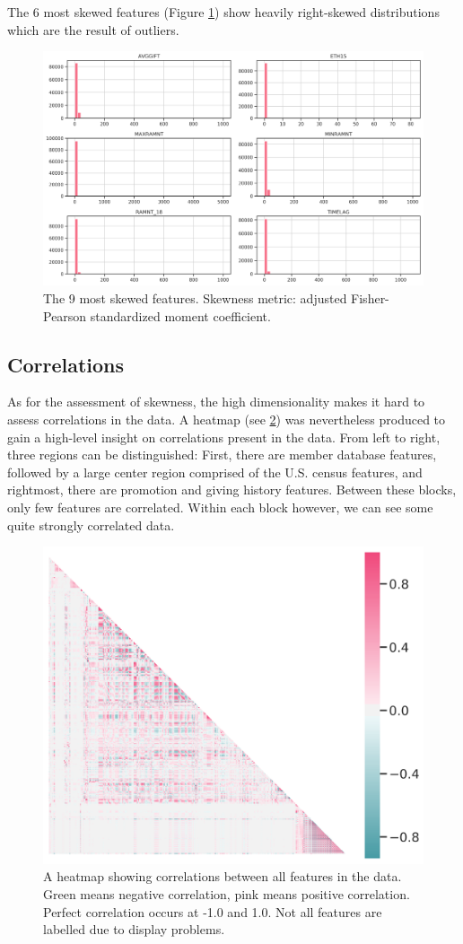 \documentclass[
  11pt,
  a4paper,
  DIV=12,captions=tableheading,oneside,titlepage=firstiscover,abstracton]{scrreprt}
\begin{document}
The 6 most skewed features (Figure \ref{fig:most-skewed}) show heavily right-skewed distributions which are the result of outliers.

\begin{figure}

{\centering \includegraphics[width=0.6\linewidth]{figures/eda/most-skewed} 

}

\caption{The 9 most skewed features. Skewness metric: adjusted Fisher-Pearson standardized moment coefficient.}\label{fig:most-skewed}
\end{figure}

\hypertarget{correlations}{%
\subsection{Correlations}\label{correlations}}

As for the assessment of skewness, the high dimensionality makes it hard to assess correlations in the data. A heatmap (see \ref{fig:heatmap-all}) was nevertheless produced to gain a high-level insight on correlations present in the data. From left to right, three regions can be distinguished: First, there are member database features, followed by a large center region comprised of the U.S. census features, and rightmost, there are promotion and giving history features. Between these blocks, only few features are correlated. Within each block however, we can see some quite strongly correlated data.



\begin{figure}

{\centering \includegraphics[width=0.6\linewidth]{figures/eda/correlations-all} 

}

\caption{A heatmap showing correlations between all features in the data. Green means negative correlation, pink means positive correlation. Perfect correlation occurs at -1.0 and 1.0. Not all features are labelled due to display problems.}\label{fig:heatmap-all}
\end{figure}
\end{document}
